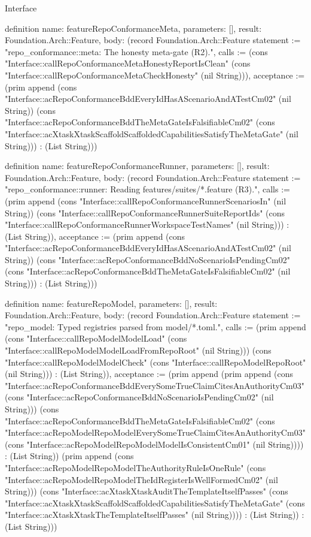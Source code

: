 \begin{lexlean}{Interface}
\begin{semanticmodule}
definition{
  name: featureRepoConformanceMeta,
  parameters: [],
  result: Foundation.Arch::Feature,
  body: (record Foundation.Arch::Feature {statement := "repo_conformance::meta: The honesty meta-gate (R2).", calls := (cons "Interface::callRepoConformanceMetaHonestyReportIsClean" (cons "Interface::callRepoConformanceMetaCheckHonesty" (nil String))), acceptance := (prim append (cons "Interface::acRepoConformanceBddEveryIdHasAScenarioAndATestCm02" (nil String)) (cons "Interface::acRepoConformanceBddTheMetaGateIsFalsifiableCm02" (cons "Interface::acXtaskXtaskScaffoldScaffoldedCapabilitiesSatisfyTheMetaGate" (nil String))) : (List String))})
}

definition{
  name: featureRepoConformanceRunner,
  parameters: [],
  result: Foundation.Arch::Feature,
  body: (record Foundation.Arch::Feature {statement := "repo_conformance::runner: Reading features/suites/*.feature (R3).", calls := (prim append (cons "Interface::callRepoConformanceRunnerScenariosIn" (nil String)) (cons "Interface::callRepoConformanceRunnerSuiteReportIds" (cons "Interface::callRepoConformanceRunnerWorkspaceTestNames" (nil String))) : (List String)), acceptance := (prim append (cons "Interface::acRepoConformanceBddEveryIdHasAScenarioAndATestCm02" (nil String)) (cons "Interface::acRepoConformanceBddNoScenarioIsPendingCm02" (cons "Interface::acRepoConformanceBddTheMetaGateIsFalsifiableCm02" (nil String))) : (List String))})
}

definition{
  name: featureRepoModel,
  parameters: [],
  result: Foundation.Arch::Feature,
  body: (record Foundation.Arch::Feature {statement := "repo_model: Typed registries parsed from model/*.toml.", calls := (prim append (cons "Interface::callRepoModelModelLoad" (cons "Interface::callRepoModelModelLoadFromRepoRoot" (nil String))) (cons "Interface::callRepoModelModelCheck" (cons "Interface::callRepoModelRepoRoot" (nil String))) : (List String)), acceptance := (prim append (prim append (cons "Interface::acRepoConformanceBddEverySomeTrueClaimCitesAnAuthorityCm03" (cons "Interface::acRepoConformanceBddNoScenarioIsPendingCm02" (nil String))) (cons "Interface::acRepoConformanceBddTheMetaGateIsFalsifiableCm02" (cons "Interface::acRepoModelRepoModelEverySomeTrueClaimCitesAnAuthorityCm03" (cons "Interface::acRepoModelRepoModelModelIsConsistentCm01" (nil String)))) : (List String)) (prim append (cons "Interface::acRepoModelRepoModelTheAuthorityRuleIsOneRule" (cons "Interface::acRepoModelRepoModelTheIdRegisterIsWellFormedCm02" (nil String))) (cons "Interface::acXtaskXtaskAuditTheTemplateItselfPasses" (cons "Interface::acXtaskXtaskScaffoldScaffoldedCapabilitiesSatisfyTheMetaGate" (cons "Interface::acXtaskXtaskTheTemplateItselfPasses" (nil String)))) : (List String)) : (List String))})
}


\end{semanticmodule}
\end{lexlean}
